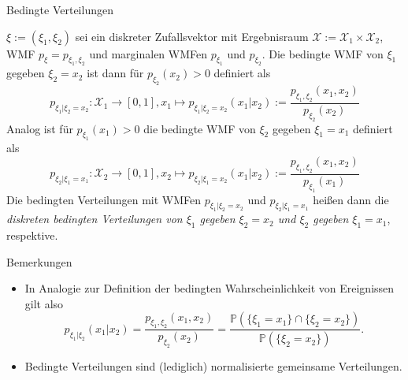 \documentclass[
  8pt,
  ignorenonframetext,
]{beamer}
\providecommand{\tightlist}{%
  \setlength{\itemsep}{0pt}\setlength{\parskip}{0pt}}
\begin{document}
\begin{frame}{Bedingte Verteilungen}
\protect\hypertarget{bedingte-verteilungen-1}{}
\footnotesize
\begin{definition}
\justifying
$\xi:= (\xi_1,\xi_2)$ sei ein diskreter Zufallsvektor mit Ergebnisraum 
$\mathcal{X} := \mathcal{X}_1 \times \mathcal{X}_2$, WMF $p_\xi = p_{\xi_1,\xi_2}$ 
und marginalen WMFen $p_{\xi_1}$ und $p_{\xi_2}$. Die bedingte WMF von $\xi_1$ gegeben 
$\xi_2 = x_2$ ist dann für $p_{\xi_2}(x_2) > 0$ definiert als
\begin{equation}
p_{\xi_1|\xi_2 = x_2} : \mathcal{X}_1 \to [0,1],
x_1 \mapsto p_{\xi_1|\xi_2 = x_2}(x_1|x_2) := \frac{p_{\xi_1,\xi_2}(x_1,x_2)}{p_{\xi_2}(x_2)}
\end{equation}
Analog ist für $p_{\xi_1}(x_1) > 0$ die bedingte WMF von $\xi_2$ gegeben $\xi_1 = x_1$ 
definiert als
\begin{equation}
p_{\xi_2|\xi_1 = x_1} : \mathcal{X}_2 \to [0,1],
x_2 \mapsto p_{\xi_2|\xi_1 = x_2}(x_1|x_2) := \frac{p_{\xi_1,\xi_2}(x_1,x_2)}{p_{\xi_1}(x_1)}
\end{equation}
Die bedingten Verteilungen mit WMFen $p_{\xi_1|\xi_2 = x_2}$ und $p_{\xi_2|\xi_1 = x_1}$ 
heißen dann die \textit{diskreten bedingten Verteilungen von $\xi_1$ gegeben $\xi_2 = x_2$ 
und $\xi_2$ gegeben $\xi_1 = x_1$}, respektive.
\end{definition}

Bemerkungen

\begin{itemize}
\tightlist
\item
  In Analogie zur Definition der bedingten Wahrscheinlichkeit von
  Ereignissen gilt also \begin{equation}
  p_{\xi_1|\xi_2}(x_1|x_2)
  = \frac{p_{\xi_1,\xi_2}(x_1,x_2)}{p_{\xi_2}(x_2)}
  = \frac{\mathbb{P}(\{\xi_1 = x_1\} \cap \{\xi_2 = x_2\})}{\mathbb{P}(\{\xi_2 = x_2\})}.
  \end{equation}
\item
  Bedingte Verteilungen sind (lediglich) normalisierte gemeinsame
  Verteilungen.
\end{itemize}
\end{frame}
\end{document}
